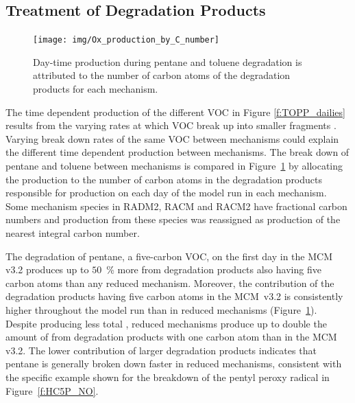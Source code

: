 \subsection{Treatment of Degradation Products} \label{ss:products} 
%
\begin{figure}
    \centering
    \texttt{[image: img/Ox\_production\_by\_C\_number]}
    \vspace{0mm}
    \caption{Day-time  production during pentane and toluene degradation is attributed to the number of carbon atoms of the degradation products for each mechanism.}
    \vspace{-4mm}
    \label{f:carbon}
\end{figure}
%
The time dependent  production of the different VOC in Figure \ref{f:TOPP_dailies} results from the varying rates at which VOC break up into smaller fragments \citep{Butler:2011}.
Varying break down rates of the same VOC between mechanisms could explain the different time dependent  production between mechanisms.
The break down of pentane and toluene between mechanisms is compared in \mbox{Figure \ref{f:carbon}} by allocating the  production to the number of carbon atoms in the degradation products responsible for  production on each day of the model run in each mechanism.
Some mechanism species in RADM2, RACM and RACM2 have fractional carbon numbers \citep{Stockwell:1990, Stockwell:1997, Goliff:2013} and  production from these species was reassigned as  production of the nearest integral carbon number.  

The degradation of pentane, a five-carbon VOC, on the first day in the MCM v3.2 produces up to \mbox{$50$ \%} more  from degradation products also having five carbon atoms than any reduced mechanism.
Moreover, the contribution of the degradation products having five carbon atoms in the \mbox{MCM v3.2} is consistently higher throughout the model run than in reduced mechanisms \mbox{(Figure \ref{f:carbon}).}
Despite producing less total , reduced mechanisms produce up to double the amount of  from degradation products with one carbon atom than in the MCM v3.2.
The lower contribution of larger degradation products indicates that pentane is generally broken down faster in reduced mechanisms, consistent with the specific example shown for the breakdown of the pentyl peroxy radical in \mbox{Figure \ref{f:HC5P_NO}}.

